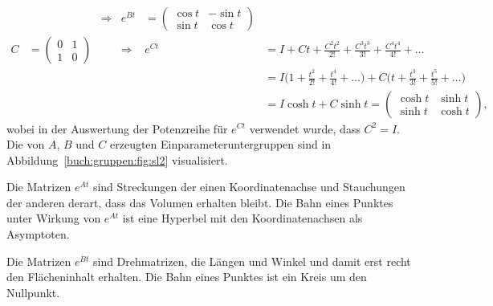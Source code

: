 \begin{beispiel}
\begin{align*}
&&\Rightarrow&
e^{Bt}
&=
\begin{pmatrix}
\cos t & -\sin t\\
\sin t &  \cos t
\end{pmatrix}
\\
C
&=
\begin{pmatrix}0&1\\1&0\end{pmatrix}
&&\Rightarrow&
e^{Ct}
&=
I + Ct + \frac{C^2t^2}{2!} + \frac{C^3t^3}{3!} + \frac{C^4t^4}{4!}+\dots
\\
&&&&
&=
I\biggl(1 + \frac{t^2}{2!} + \frac{t^4}{4!}+\dots \biggr)
+
C\biggl(t + \frac{t^3}{3!} + \frac{t^5}{5!}+\dots \biggr)
\\
&&&&
&=
I\cosh t + C \sinh t
=
\begin{pmatrix}
\cosh t & \sinh t\\
\sinh t & \cosh t
\end{pmatrix},
\end{align*}
wobei in der Auswertung der Potenzreihe für $e^{Ct}$ verwendet wurde,
dass $C^2=I$.
Die von $A$, $B$ und $C$ erzeugten Einparameteruntergruppen sind in
Abbildung~\ref{buch:gruppen:fig:sl2} visualisiert.

Die Matrizen $e^{At}$ sind Streckungen der einen Koordinatenachse und
Stauchungen der anderen derart, dass das Volumen erhalten bleibt.
Die Bahn eines Punktes unter Wirkung von $e^{At}$ ist eine Hyperbel
mit den Koordinatenachsen als Asymptoten.

Die Matrizen $e^{Bt}$ sind Drehmatrizen, die Längen und Winkel und
damit erst recht den Flächeninhalt erhalten.
Die Bahn eines Punktes ist ein Kreis um den Nullpunkt.


\end{beispiel}
